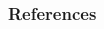 
\begin{frame}[allowframebreaks]
\frametitle{References}

\begin{thebibliography}{99} %

\fsize{






%




}
\end{thebibliography}
\end{frame}
